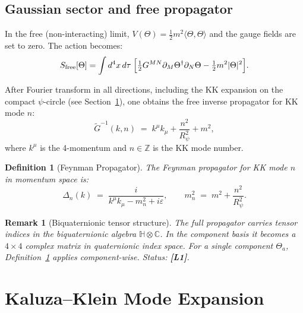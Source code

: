 \documentclass[11pt,a4paper]{article}
\newtheorem{definition}{Definition}
\newtheorem{remark}{Remark}
\begin{document}
\subsection{Gaussian sector and free propagator}

In the free (non-interacting) limit, $V(\Theta) = \tfrac{1}{2}m^2\langle\Theta,\Theta\rangle$
and the gauge fields are set to zero.  The action becomes:
\begin{equation}
\label{eq:S_free}
  S_{\mathrm{free}}[\Theta]
  = \int d^4x\, d\tau\; \Bigl[
    \tfrac{1}{2} G^{MN} \partial_M \Theta^\dagger \partial_N \Theta
    - \tfrac{1}{2} m^2 |\Theta|^2
  \Bigr].
\end{equation}

After Fourier transform in all directions, including the KK expansion on the
compact $\psi$-circle (see Section~\ref{sec:kk}), one obtains the free
inverse propagator for KK mode $n$:
\begin{equation}
\label{eq:inv_prop}
  \tilde{G}^{-1}(k, n) \;=\; k^\mu k_\mu + \frac{n^2}{R_\psi^2} + m^2,
\end{equation}
where $k^\mu$ is the 4-momentum and $n \in \mathbb{Z}$ is the KK mode number.

\begin{definition}[Feynman Propagator]\label{def:propagator}
The Feynman propagator for KK mode $n$ in momentum space is:
\begin{equation}
\label{eq:propagator}
  \boxed{
  \Delta_n(k) \;=\; \frac{i}{k^\mu k_\mu - m_n^2 + i\varepsilon},
  \qquad
  m_n^2 \;=\; m^2 + \frac{n^2}{R_\psi^2}.
  }
\end{equation}
\end{definition}

\begin{remark}[Biquaternionic tensor structure]
  The full propagator carries tensor indices in the biquaternionic algebra
  $\mathbb{H}\otimes\mathbb{C}$.  In the component basis it becomes a
  $4\times 4$ complex matrix in quaternionic index space.  For a single
  component $\Theta_a$, Definition~\ref{def:propagator} applies component-wise.
  Status: \textbf{[L1]}.
\end{remark}

\section{Kaluza--Klein Mode Expansion}
\label{sec:kk}
\end{document}
